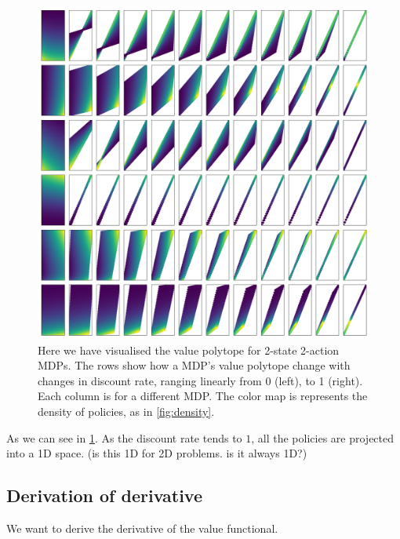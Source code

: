 \begin{figure}
\centering
\includegraphics[width=1\textwidth,height=1\textheight]{../../pictures/figures/discounts.png}
\caption{Here we have visualised the value polytope for 2-state 2-action MDPs. The
rows show how a MDP's value polytope change with changes in discount rate, ranging linearly from 0 (left), to 1 (right).
Each column is for a different MDP.
The color map is represents the density of policies, as in \ref{fig:density}.}
\label{fig:polytope-discounts}
\end{figure}

As we can see in \ref{fig:polytope-discounts}. As the discount rate tends to $1$,
all the policies are projected into a 1D space. (is this 1D for 2D problems. is it always 1D?)

\subsection{Derivation of derivative}

We want to derive the derivative of the value functional.

